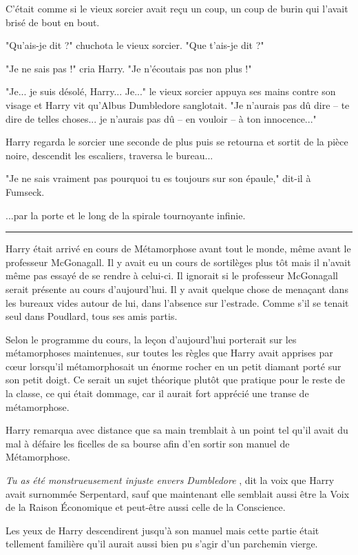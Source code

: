 C'était comme si le vieux sorcier avait reçu un coup, un coup de burin qui l'avait brisé de bout en bout.

"Qu'ais-je dit ?" chuchota le vieux sorcier. "Que t'ais-je dit ?"

"Je ne sais pas !" cria Harry. "Je n'écoutais pas non plus !"

"Je... je suis désolé, Harry... Je..." le vieux sorcier appuya ses mains contre son visage et Harry vit qu'Albus Dumbledore sanglotait. "Je n'aurais pas dû dire – te dire de telles choses... je n'aurais pas dû – en vouloir – à ton innocence..."

Harry regarda le sorcier une seconde de plus puis se retourna et sortit de la pièce noire, descendit les escaliers, traversa le bureau...

"Je ne sais vraiment pas pourquoi tu es toujours sur son épaule," dit-il à Fumseck.

...par la porte et le long de la spirale tournoyante infinie.
\par\noindent\rule{\textwidth}{0.4pt}
Harry était arrivé en cours de Métamorphose avant tout le monde, même avant le professeur McGonagall. Il y avait eu un cours de sortilèges plus tôt mais il n'avait même pas essayé de se rendre à celui-ci. Il ignorait si le professeur McGonagall serait présente au cours d'aujourd'hui. Il y avait quelque chose de menaçant dans les bureaux vides autour de lui, dans l'absence sur l'estrade. Comme s'il se tenait seul dans Poudlard, tous ses amis partis.

Selon le programme du cours, la leçon d'aujourd'hui porterait sur les métamorphoses maintenues, sur toutes les règles que Harry avait apprises par cœur lorsqu'il métamorphosait un énorme rocher en un petit diamant porté sur son petit doigt. Ce serait un sujet théorique plutôt que pratique pour le reste de la classe, ce qui était dommage, car il aurait fort apprécié une transe de métamorphose.

Harry remarqua avec distance que sa main tremblait à un point tel qu'il avait du mal à défaire les ficelles de sa bourse afin d'en sortir son manuel de Métamorphose.

\emph{Tu as été monstrueusement injuste envers Dumbledore} , dit la voix que Harry avait surnommée Serpentard, sauf que maintenant elle semblait aussi être la Voix de la Raison Économique et peut-être aussi celle de la Conscience.

Les yeux de Harry descendirent jusqu'à son manuel mais cette partie était tellement familière qu'il aurait aussi bien pu s'agir d'un parchemin vierge.

